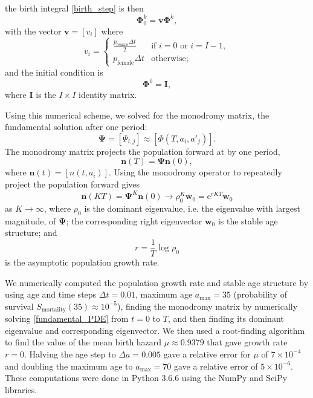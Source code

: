 \documentclass[12pt]{article}
\renewcommand{\vec}[1]{\mathbf{#1}}
\newcommand{\mat}[1]{\mathbf{#1}}
\newcommand{\me}{\mathrm{e}}
\begin{document}
the birth integral \eqref{birth_step} is then
\begin{equation}
  \mat{\Phi}_0^k = \vec{v} \mat{\Phi}^k,
\end{equation}
with the vector $\vec{v} = [v_i]$ where
\begin{equation}
  v_i =
  \begin{cases}
    \frac{p_{\text{female}} \Delta t}{2}
    & \text{if $i = 0$ or $i = I - 1$}, \\
    p_{\text{female}} \Delta t
    & \text{otherwise};
  \end{cases}
\end{equation}
and the initial condition is
\begin{equation}
  \mat{\Phi}^0 = \mat{I},
\end{equation}
where $\mat{I}$ is the $I \times I$ identity matrix.

Using this numerical scheme, we solved for the monodromy matrix, the
fundamental solution after one period:
\begin{equation}
  \mat{\Psi} = [\Psi_{i, j}] \approx [\Phi(T, a_i, a'_j)].
\end{equation}
The monodromy matrix projects the population forward at by one period,
\begin{equation}
  \vec{n}(T) = \mat{\Psi} \vec{n}(0),
\end{equation}
where $\vec{n}(t) = [n(t, a_i)]$.
Using the monodromy operator to repeatedly project the population
forward gives
\begin{equation}
  \vec{n}(K T)
  = \mat{\Psi}^K \vec{n}(0)
  \to \rho_0^K \vec{w}_0
  = \me^{r K T} \vec{w}_0
\end{equation}
as $K \to \infty$,
where $\rho_0$ is the dominant eigenvalue, i.e. the eigenvalue with
largest magnitude, of $\mat{\Psi}$;
the corresponding right eigenvector $\vec{w}_0$ is the stable age
structure; and
\begin{equation}
  r = \frac{1}{T} \log \rho_0
\end{equation}
is the asymptotic population growth rate.

We numerically computed the population growth rate and stable age
structure by using age and time steps $\Delta t = 0.01$,
maximum age $a_{\text{max}} = 35$
(probability of survival
$S_{\text{mortality}}(35) \approx 10^{-5}$),
finding the monodromy matrix by numerically solving
\eqref{fundamental_PDE} from $t = 0$ to $T$, and
then finding its dominant eigenvalue and corresponding eigenvector.
We then used a root-finding algorithm to find the value of the mean
birth hazard $\mu \approx 0.9379$ that gave growth rate $r = 0$.
Halving the age step to $\Delta a = 0.005$
gave a relative error for $\mu$ of $7 \times 10^{-4}$
and doubling the maximum age to $a_{\text{max}} = 70$
gave a relative error of $5 \times 10^{-6}$.
These computations were done in Python 3.6.6 \citep{python} using the
NumPy \citep{numpy} and SciPy \citep{scipy} libraries.
\end{document}
